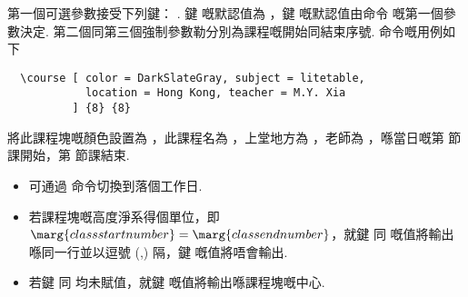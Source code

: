 \documentclass[letterpaper]{l3doc}
\begin{document}
第一個可選參數接受下列鍵：    . 鍵  嘅默認值為 ，鍵  嘅默認值由命令  嘅第一個參數決定. 第二個同第三個強制參數勒分別為課程嘅開始同結束序號.  命令嘅用例如下

\begin{Verbatim}
  \course [ color = DarkSlateGray, subject = litetable,
            location = Hong Kong, teacher = M.Y. Xia
          ] {8} {8}
\end{Verbatim}

\begin{center}
  \noindent\fbox
  {
    \parbox{.96\linewidth}
    {
      將此課程塊嘅顏色設置為 ，此課程名為 ，上堂地方為 ，老師為 ，喺當日嘅第  節課開始，第  節課結束.
    }
  }
\end{center}

\begin{itemize}
  \item 可通過  命令切換到落個工作日.
  \item 若課程塊嘅高度淨系得個單位，即$\marg{class start number} = \marg{class end number}$，就鍵  同  嘅值將輸出喺同一行並以逗號 (,) 隔，鍵  嘅值將唔會輸出.
  \item 若鍵  同  均未賦值，就鍵  嘅值將輸出喺課程塊嘅中心.
\end{itemize}


\end{document}
